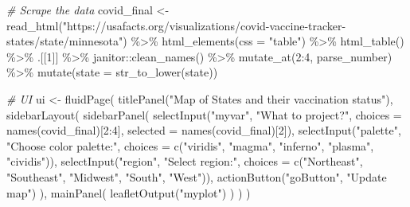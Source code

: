 \documentclass[
]{book}
\newenvironment{Shaded}{\begin{snugshade}}{\end{snugshade}}
\newcommand{\AttributeTok}[1]{\textcolor[rgb]{0.77,0.63,0.00}{#1}}
\newcommand{\CommentTok}[1]{\textcolor[rgb]{0.56,0.35,0.01}{\textit{#1}}}
\newcommand{\DecValTok}[1]{\textcolor[rgb]{0.00,0.00,0.81}{#1}}
\newcommand{\FunctionTok}[1]{\textcolor[rgb]{0.00,0.00,0.00}{#1}}
\newcommand{\NormalTok}[1]{#1}
\newcommand{\OtherTok}[1]{\textcolor[rgb]{0.56,0.35,0.01}{#1}}
\newcommand{\SpecialCharTok}[1]{\textcolor[rgb]{0.00,0.00,0.00}{#1}}
\newcommand{\StringTok}[1]{\textcolor[rgb]{0.31,0.60,0.02}{#1}}
\begin{document}
\begin{Shaded}
\begin{Highlighting}[]
\CommentTok{\# Scrape the data}
\NormalTok{covid\_final }\OtherTok{\textless{}{-}} \FunctionTok{read\_html}\NormalTok{(}\StringTok{"https://usafacts.org/visualizations/covid{-}vaccine{-}tracker{-}states/state/minnesota"}\NormalTok{) }\SpecialCharTok{\%\textgreater{}\%}
  \FunctionTok{html\_elements}\NormalTok{(}\AttributeTok{css =} \StringTok{"table"}\NormalTok{) }\SpecialCharTok{\%\textgreater{}\%} \FunctionTok{html\_table}\NormalTok{() }\SpecialCharTok{\%\textgreater{}\%}\NormalTok{ .[[}\DecValTok{1}\NormalTok{]] }\SpecialCharTok{\%\textgreater{}\%}
\NormalTok{  janitor}\SpecialCharTok{::}\FunctionTok{clean\_names}\NormalTok{() }\SpecialCharTok{\%\textgreater{}\%}
  \FunctionTok{mutate\_at}\NormalTok{(}\DecValTok{2}\SpecialCharTok{:}\DecValTok{4}\NormalTok{, parse\_number) }\SpecialCharTok{\%\textgreater{}\%} \FunctionTok{mutate}\NormalTok{(}\AttributeTok{state =} \FunctionTok{str\_to\_lower}\NormalTok{(state))}



\CommentTok{\# UI}
\NormalTok{ui }\OtherTok{\textless{}{-}} \FunctionTok{fluidPage}\NormalTok{(}
  \FunctionTok{titlePanel}\NormalTok{(}\StringTok{"Map of States and their vaccination status"}\NormalTok{),}
  \FunctionTok{sidebarLayout}\NormalTok{(}
    \FunctionTok{sidebarPanel}\NormalTok{(}
      \FunctionTok{selectInput}\NormalTok{(}\StringTok{"myvar"}\NormalTok{, }\StringTok{"What to project?"}\NormalTok{, }\AttributeTok{choices =} \FunctionTok{names}\NormalTok{(covid\_final)[}\DecValTok{2}\SpecialCharTok{:}\DecValTok{4}\NormalTok{], }\AttributeTok{selected =} \FunctionTok{names}\NormalTok{(covid\_final)[}\DecValTok{2}\NormalTok{]),}
      \FunctionTok{selectInput}\NormalTok{(}\StringTok{"palette"}\NormalTok{, }\StringTok{"Choose color palette:"}\NormalTok{, }\AttributeTok{choices =} \FunctionTok{c}\NormalTok{(}\StringTok{"viridis"}\NormalTok{, }\StringTok{"magma"}\NormalTok{, }\StringTok{"inferno"}\NormalTok{, }\StringTok{"plasma"}\NormalTok{, }\StringTok{"cividis"}\NormalTok{)),}
      \FunctionTok{selectInput}\NormalTok{(}\StringTok{"region"}\NormalTok{, }\StringTok{"Select region:"}\NormalTok{, }\AttributeTok{choices =} \FunctionTok{c}\NormalTok{(}\StringTok{"Northeast"}\NormalTok{, }\StringTok{"Southeast"}\NormalTok{, }\StringTok{"Midwest"}\NormalTok{, }\StringTok{"South"}\NormalTok{, }\StringTok{"West"}\NormalTok{)),}
      \FunctionTok{actionButton}\NormalTok{(}\StringTok{"goButton"}\NormalTok{, }\StringTok{"Update map"}\NormalTok{)}
\NormalTok{    ),}
    \FunctionTok{mainPanel}\NormalTok{(}
      \FunctionTok{leafletOutput}\NormalTok{(}\StringTok{"myplot"}\NormalTok{)}
\NormalTok{    )}
\NormalTok{  ) }
\NormalTok{)}



\end{Highlighting}
\end{Shaded}
\end{document}

